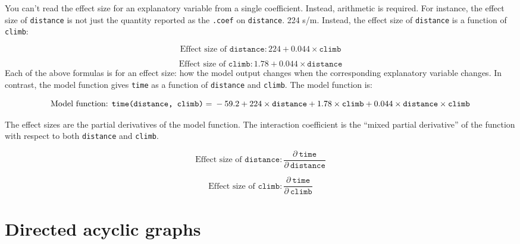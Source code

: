 \documentclass[
  letterpaper,
  DIV=11,
  numbers=noendperiod,
  oneside]{scrartcl}
\begin{document}
You can't read the effect size for an explanatory variable from a single
coefficient. Instead, arithmetic is required. For instance, the effect
size of \texttt{distance} is not just the quantity reported as the
\texttt{.coef} on \texttt{distance}. 224 s/m. Instead, the effect size
of \texttt{distance} is a function of \texttt{climb}:

\[\text{Effect size of }\mathtt{distance}: 224 + 0.044 \times \mathtt{climb}\]

\[\text{Effect size of }\mathtt{climb}: 1.78 + 0.044 \times \mathtt{distance}\]
Each of the above formulas is for an effect size: how the model output
changes when the corresponding explanatory variable changes. In
contrast, the model function gives \texttt{time} as a function of
\texttt{distance} and \texttt{climb}. The model function is:

\[\text{Model function: }\texttt{time(distance, climb)} = \\-59.2 + 224 \times \texttt{distance} + 1.78 \times \texttt{climb} + 0.044 \times \texttt{distance} \times \texttt{climb}\]

\begin{tcolorbox}[enhanced jigsaw, colbacktitle=quarto-callout-note-color!10!white, opacityback=0, breakable, opacitybacktitle=0.6, colback=white, coltitle=black, arc=.35mm, title=\textcolor{quarto-callout-note-color}{\faInfo}\hspace{0.5em}{For the reader who has already studied calculus:}, left=2mm, colframe=quarto-callout-note-color-frame, rightrule=.15mm, bottomrule=.15mm, leftrule=.75mm, bottomtitle=1mm, toptitle=1mm, titlerule=0mm, toprule=.15mm]

The effect sizes are the partial derivatives of the model function. The
interaction coefficient is the ``mixed partial derivative'' of the
function with respect to both \texttt{distance} and \texttt{climb}.

\[\text{Effect size of }\mathtt{distance}: \frac{\partial\  \texttt{time}}{\partial\ \texttt{distance}}\]

\[\text{Effect size of }\mathtt{climb}: \frac{\partial\  \texttt{time}}{\partial\ \texttt{climb}}\]

\end{tcolorbox}

\newpage

\section{Directed acyclic graphs}\label{sec-DAGs}
\end{document}
